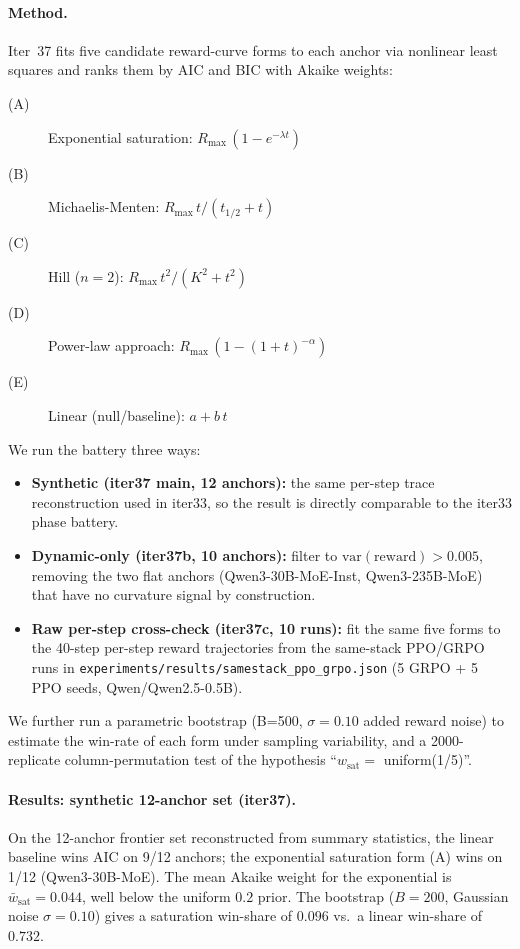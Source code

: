 \paragraph{Method.}
Iter~37 fits five candidate reward-curve forms to each anchor via
nonlinear least squares and ranks them by AIC and BIC with Akaike
weights:
\begin{description}
\item[(A)] Exponential saturation: $R_{\max}\,(1 - e^{-\lambda t})$
\item[(B)] Michaelis-Menten: $R_{\max}\,t/(t_{1/2} + t)$
\item[(C)] Hill ($n=2$): $R_{\max}\,t^2/(K^2 + t^2)$
\item[(D)] Power-law approach: $R_{\max}\,(1 - (1 + t)^{-\alpha})$
\item[(E)] Linear (null/baseline): $a + b\,t$
\end{description}
We run the battery three ways:
\begin{itemize}
\item \textbf{Synthetic (iter37 main, 12 anchors):} the same per-step
  trace reconstruction used in iter33, so the result is directly
  comparable to the iter33 phase battery.
\item \textbf{Dynamic-only (iter37b, 10 anchors):} filter to
  $\mathrm{var}(\mathrm{reward}) > 0.005$, removing the two flat
  anchors (Qwen3-30B-MoE-Inst, Qwen3-235B-MoE) that have no curvature
  signal by construction.
\item \textbf{Raw per-step cross-check (iter37c, 10 runs):} fit the
  same five forms to the 40-step per-step reward trajectories from
  the same-stack PPO/GRPO runs in
  \texttt{experiments/results/samestack\_ppo\_grpo.json}
  (5 GRPO + 5 PPO seeds, Qwen/Qwen2.5-0.5B).
\end{itemize}
We further run a parametric bootstrap (B=500, $\sigma=0.10$ added
reward noise) to estimate the win-rate of each form under sampling
variability, and a 2000-replicate column-permutation test of the
hypothesis ``$w_{\mathrm{sat}} = $ uniform(1/5)''.

\paragraph{Results: synthetic 12-anchor set (iter37).}
On the 12-anchor frontier set reconstructed from summary statistics,
the linear baseline wins AIC on 9/12 anchors; the exponential
saturation form (A) wins on 1/12 (Qwen3-30B-MoE). The mean Akaike
weight for the exponential is $\bar{w}_{\mathrm{sat}} = 0.044$, well
below the uniform $0.2$ prior. The bootstrap
($B{=}200$, Gaussian noise $\sigma{=}0.10$) gives a saturation
win-share of $0.096$ vs.\ a linear win-share of $0.732$.

